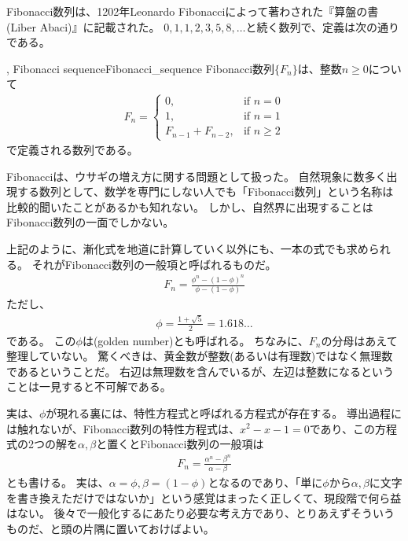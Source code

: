 Fibonacci数列は、1202年Leonardo Fibonacciによって著わされた『算盤の書(Liber Abaci)』に記載された。
$0,1,1,2,3,5,8,\ldots$と続く数列で、定義は次の通りである。

\begin{Defi}{, Fibonacci sequence}{Fibonacci_sequence}
Fibonacci数列$\{F_n\}$は、整数$n\ge0$について
\begin{align*}
F_n =
\begin{cases}
0, &\mbox{if } n = 0\\
1, &\mbox{if } n = 1\\
F_{n - 1} + F_{n - 2}, &\mbox{if } n \ge 2
\end{cases}
\end{align*}
で定義される数列である。
\end{Defi}

Fibonacciは、ウサギの増え方に関する問題として扱った。
自然現象に数多く出現する数列として、数学を専門にしない人でも「Fibonacci数列」という名称は比較的聞いたことがあるかも知れない。
しかし、自然界に出現することはFibonacci数列の一面でしかない。


上記のように、漸化式を地道に計算していく以外にも、一本の式でも求められる。
それがFibonacci数列の一般項と呼ばれるものだ。
\begin{align*}
F_n = \frac{\phi^n - (1 - \phi)^n}{\phi - (1 - \phi)}
\end{align*}
ただし、
\begin{align*}
\phi = \frac{1 + \sqrt{5}}{2} = 1.618\ldots
\end{align*}
である。
この$\phi$は(golden number)とも呼ばれる。
ちなみに、$F_n$の分母はあえて整理していない。
驚くべきは、黄金数が整数(あるいは有理数)ではなく無理数であるということだ。
右辺は無理数を含んでいるが、左辺は整数になるということは一見すると不可解である。

実は、$\phi$が現れる裏には、特性方程式と呼ばれる方程式が存在する。
導出過程には触れないが、Fibonacci数列の特性方程式は、$x^2-x-1=0$であり、この方程式の2つの解を$\alpha, \beta$と置くとFibonacci数列の一般項は
\begin{align*}
F_n = \frac{\alpha^n - \beta^n}{\alpha - \beta}
\end{align*}
とも書ける。
実は、$\alpha=\phi,\beta=(1-\phi)$となるのであり、「単に$\phi$から$\alpha, \beta$に文字を書き換えただけではないか」という感覚はまったく正しくて、現段階で何ら益はない。
後々で一般化するにあたり必要な考え方であり、とりあえずそういうものだ、と頭の片隅に置いておけばよい。

